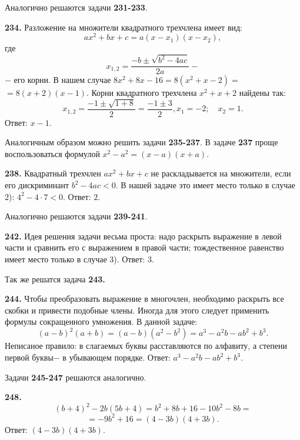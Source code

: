 Аналогично решаются задачи \textbf{231-233}.

\textbf{234.} Разложение на множители  квадратного трехчлена имеет вид:
$$ax^2+bx+c=a\left(x-x_1\right)\left(x-x_2\right),$$ где $$x_{1,2}=\frac{-b\pm\sqrt{b^2-4ac}}{2a}-$$ $-$ его корни. В нашем случае $8x^2+8x-16=8(x^2+x-2)=$\newline$=8\left(x+2\right)\left(x-1\right)$. Корни квадратного трехчлена $x^2+x+2$ найдены так:
$$x_{1,2}=\frac{-1\pm\sqrt{1+8}}{2}=\frac{-1\pm3}{2}, x_1=-2;\quad x_2=1.$$ \newline \null \hspace*{\fill} Ответ: $x-1$. 

Аналогичным образом можно решить задачи  \textbf{235-237}. В задаче \textbf{237} проще воспользоваться формулой $x^2-a^2=\left(x-a\right)\left(x+a\right)$.

\textbf{238.} Квадратный трехчлен $ax^2+bx+c$ не раскладывается на множители, если его дискриминант $b^2-4ac<0$. В нашей задаче это имеет место только в случае 2): $4^2-4\cdot7<0$. \newline \null \hspace*{\fill} Ответ: $2$. 

Аналогично решаются задачи  \textbf{239-241}.

\textbf{242.}  Идея решения задачи весьма проста: надо раскрыть выражение в левой части и сравнить его с выражением в правой части; тождественное равенство имеет место только в случае 3). \newline \null \hspace*{\fill} Ответ: $3$. 

Так же решатся задача  \textbf{243.}

\textbf{244.}  Чтобы преобразовать выражение в многочлен, необходимо раскрыть все скобки и привести подобные члены. Иногда для этого следует применить формулы сокращенного умножения. В данной задаче:  
$$\left(a-b\right)^2\left(a+b\right)=\left(a-b\right)\left(a^2-b^2\right)=a^3-a^2b-ab^2+b^3.$$
Неписаное правило: в слагаемых буквы расставляются по алфавиту, а степени первой буквы$-$ в убывающем порядке. \newline \null \hspace*{\fill} Ответ: $a^3-a^2b-ab^2+b^3$.  

Задачи \textbf{245-247} решаются аналогично.

\textbf{248.}  
$$\left(b+4\right)^2-2b\left(5b+4\right)=b^2+8b+16-10b^2-8b=$$ $$=-9b^2+16=\left(4-3b\right)\left(4+3b\right).$$ \newline \null \hspace*{\fill} Ответ: $(4-3b)(4+3b)$. 

